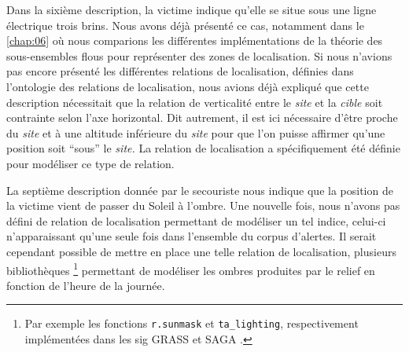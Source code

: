 Dans la sixième description, la victime indique qu'elle se situe sous
une ligne électrique trois brins. Nous avons déjà présenté ce cas,
notamment dans le \autoref{chap:06} où nous comparions les différentes
implémentations de la théorie des sous-ensembles flous pour
représenter des zones de localisation. Si nous n'avions pas encore
présenté les différentes relations de localisation, définies dans
l'ontologie des relations de localisation, nous avions déjà expliqué
que cette description nécessitait que la relation de verticalité entre
le \emph{site} et la \emph{cible} soit contrainte selon l'axe
horizontal. Dit autrement, il est ici nécessaire d'être proche du
\emph{site} et à une altitude inférieure du \emph{site} pour que l'on
puisse affirmer qu'une position soit \enquote{sous} le \emph{site.}
La relation de localisation  a spécifiquement
été définie pour modéliser ce type de relation.

La septième description donnée par le secouriste nous indique que la
position de la victime vient de passer du Soleil à l'ombre. Une
nouvelle fois, nous n'avons pas défini de relation de localisation
permettant de modéliser un tel indice, celui-ci n'apparaissant qu'une
seule fois dans l'ensemble du corpus d'alertes. Il serait cependant
possible de mettre en place une telle relation de localisation,
plusieurs bibliothèques \footnote{Par exemple les fonctions
  \texttt{r.sunmask} et \texttt{ta\_lighting}, respectivement
  implémentées dans les \ac{sig} GRASS \autocite{GDT2020} et SAGA
  \autocite{Conrad2015}.} permettant de modéliser les ombres produites
par le relief en fonction de l'heure de la journée.

